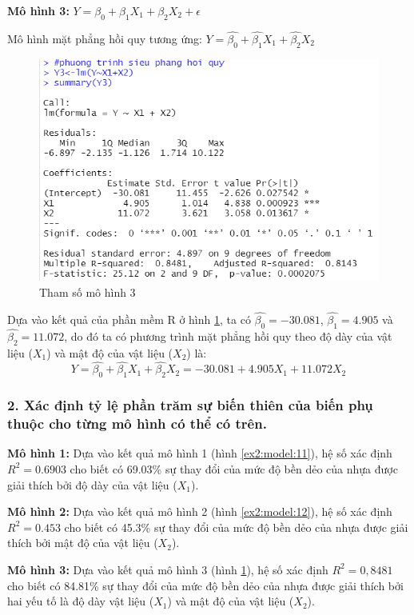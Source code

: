 \documentclass[a4paper]{article}
\theoremstyle{nonumberplain}
\begin{document}
\textbf{Mô hình 3:} $Y= \beta_0 + \beta_1 X_1 + \beta_2 X_2+ \epsilon$

Mô hình mặt phẳng hồi quy tương ứng: $Y= \hat{\beta_0} + \hat{\beta_1} X_1 + \hat{\beta_2} X_2$

\begin{figure}[h!]
	\centering
	\includegraphics[width=0.7\linewidth]{bai2_1iii.PNG} 
	\caption{Tham số mô hình 3}
	\label{ex2:model:13}
\end{figure}

Dựa vào kết quả của phần mềm R ở hình \ref{ex2:model:13}, ta có $\hat{\beta_0} = -30.081$, $\hat{\beta_1} = 4.905$ và $\hat{\beta_2} = 11.072$, do đó ta có phương trình mặt phẳng hồi quy theo độ dày của vật liệu ($X_1$) và mật độ của vật liệu ($X_2$) là:
\[Y = \hat{\beta_0} + \hat{\beta_1} X_1 + \hat{\beta_2} X_2 = -30.081 + 4.905 X_1 + 11.072 X_2\]

\subsubsection*{2. Xác định tỷ lệ phần trăm sự biến thiên của biến phụ thuộc cho từng mô hình có thể có trên.}

\textbf{Mô hình 1:} Dựa vào kết quả mô hình 1 (hình \ref{ex2:model:11}), hệ số xác định $R^2= 0.6903$ cho biết có 69.03\% sự thay đổi của mức độ bền dẻo của nhựa được giải thích bởi độ dày của vật liệu ($X_1$).

\textbf{Mô hình 2:} Dựa vào kết quả mô hình 2 (hình \ref{ex2:model:12}), hệ số xác định $R^2= 0.453$ cho biết có 45.3\% sự thay đổi của mức độ bền dẻo của nhựa được giải thích bởi mật độ của vật liệu ($X_2$).

\textbf{Mô hình 3:} Dựa vào kết quả mô hình 3 (hình \ref{ex2:model:13}), hệ số xác định $R^2= 0,8481$ cho biết có 84.81\% sự thay đổi của mức độ bền dẻo của nhựa được giải thích bởi hai yếu tố là độ dày vật liệu ($X_1$) và mật độ của vật liệu ($X_2$).
\end{document}

